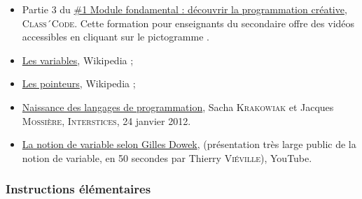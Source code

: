 \begin{gofurther}
\begin{itemize}\jazzitem
	\item Partie 3 du \href{https://pixees.fr/classcode/formations/module1/\#partie3}{\#1 Module fondamental : découvrir la programmation créative}, \textsc{Class´Code}. Cette formation pour enseignants du secondaire offre des vidéos accessibles en cliquant sur le pictogramme .
\end{itemize}

\begin{itemize}\jazzitem
\item \href{https://fr.wikipedia.org/wiki/Variable_(informatique)}{Les variables}, Wikipedia ;
\item \href{https://fr.wikipedia.org/wiki/Pointeur_(programmation)}{Les pointeurs}, Wikipedia ;
\item \href{https://interstices.info/naissance-des-langages-de-programmation/}{Naissance des langages de programmation}, Sacha \textsc{Krakowiak} et Jacques \textsc{Mossière}, \textsc{Interstices}, 24 janvier 2012.
\end{itemize}

\begin{itemize}\jazzitem
\item \href{https://www.youtube.com/watch?v=zbpo7XB5bTo&index=7&list=PLWvGMqXvyJAPWRbAADvvxsWUtiRZ_dGqT}{La notion de variable selon Gilles Dowek}, (présentation très large public de la notion de variable, en 50 secondes par Thierry \textsc{Viéville}), YouTube.
\end{itemize}
\end{gofurther}

\subsubsection[Instructions élémentaires]{Instructions élémentaires}
\label{subsub:VI.1.1.3}

